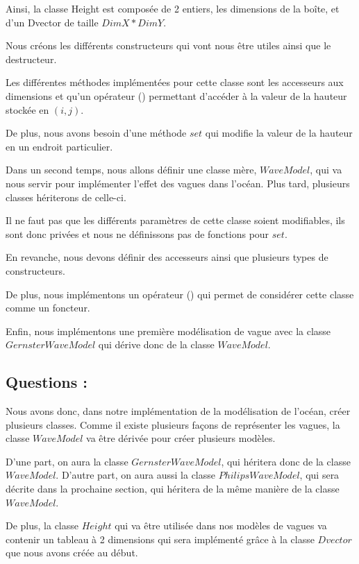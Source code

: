 \documentclass{article}
\begin{document}
Ainsi, la classe Height est composée de 2 entiers, les dimensions de la boîte, et d'un Dvector de taille $DimX * DimY$.

Nous créons les différents constructeurs qui vont nous être utiles ainsi que le destructeur.

Les différentes méthodes implémentées pour cette classe sont les accesseurs aux dimensions et qu'un opérateur () permettant d'accéder à la valeur de la hauteur stockée en $(i,j)$.

De plus, nous avons besoin d'une méthode $set$ qui modifie la valeur de la hauteur en un endroit particulier.

Dans un second temps,  nous allons définir une classe mère, $WaveModel$, qui va nous servir pour implémenter l'effet des vagues dans l'océan. Plus tard, plusieurs classes hériterons de celle-ci.

Il ne faut pas que les différents paramètres de cette classe soient modifiables, ils sont donc privées et nous ne définissons pas de fonctions pour $set$.

En revanche, nous devons définir des accesseurs ainsi que plusieurs types de constructeurs.

De plus, nous implémentons un opérateur () qui permet de considérer cette classe comme un foncteur.

Enfin, nous implémentons une première modélisation de vague avec la classe $GernsterWaveModel$ qui dérive donc de la classe $WaveModel$.

\vspace{0.5cm}

\subsection{Questions :}

Nous avons donc, dans notre implémentation de la modélisation de l'océan, créer plusieurs classes. Comme il existe plusieurs façons de représenter les vagues, la classe $WaveModel$ va être dérivée pour créer plusieurs modèles.

D'une part, on aura la classe $GernsterWaveModel$, qui héritera donc de la classe $WaveModel$. D'autre part, on aura aussi la classe $PhilipsWaveModel$, qui sera décrite dans la prochaine section, qui héritera de la même manière de la classe $WaveModel$.

De plus, la classe $Height$ qui va être utilisée dans nos modèles de vagues va contenir un tableau à 2 dimensions qui sera implémenté grâce à la classe $Dvector$ que nous avons créée au début.
\end{document}
